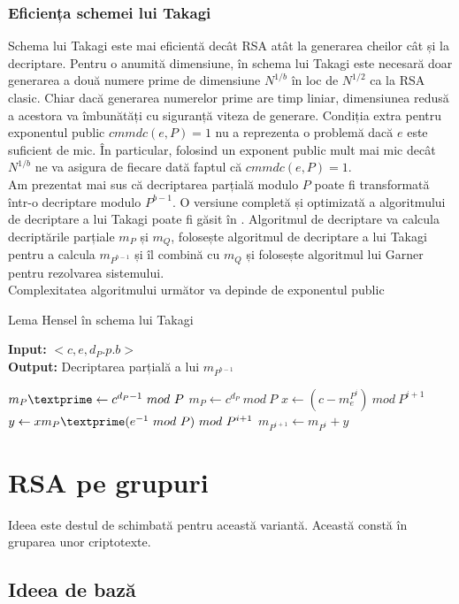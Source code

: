 \documentclass[12pt, oneside]{book}
\begin{document}
\subsubsection{Eficiența schemei lui Takagi}
Schema lui Takagi este mai eficientă decât RSA atât la generarea cheilor cât și la decriptare. Pentru o anumită dimensiune, în schema lui Takagi este necesară doar generarea a două numere prime de dimensiune $N^{1/b}$ în loc de $N^{1/2}$ ca la RSA clasic. Chiar dacă generarea numerelor prime are timp liniar, dimensiunea redusă a acestora va îmbunătăți cu siguranță viteza de generare. Condiția extra pentru exponentul public $cmmdc(e,P)=1$ nu a reprezenta o problemă dacă $e$ este suficient de mic. În particular, folosind un exponent public mult mai mic decât $N^{1/b}$ ne va asigura de fiecare dată faptul că $cmmdc(e,P)=1$. \\
Am prezentat mai sus că decriptarea parțială modulo $P$ poate fi transformată într-o decriptare modulo $P^{b-1}$. O versiune completă și optimizată a algoritmului de decriptare a lui Takagi poate fi găsit în \cite{takagi}. Algoritmul de decriptare va calcula decriptările parțiale $m_P$ și $m_Q$, folosește algoritmul de decriptare a lui Takagi pentru a calcula $m_{P^{b-1}}$ și îl combină cu $m_Q$ și folosește algoritmul lui Garner pentru rezolvarea sistemului. \\
Complexitatea algoritmului următor va depinde de exponentul public
\begin{algorithm}[H]
		   \caption{Lema Hensel în schema lui Takagi}
		   \textbf{Input:} $<c,e,d_P.p.b>$ \\
		   \textbf{Output:} Decriptarea parțială a lui $ m_{P^{b-1}} $
		   \begin{algorithmic}
		   	\State $m_P \textprime \gets c^{d_P -1} \ mod \ P$
		   	\State $m_P \gets c^{d_P} \ mod \ P$
		   	\State $x \gets (c-m_{e}^{P^i}) \ mod \ P^{i+1}$
		   	\State $y \gets xm_P \textprime (e^{-1} \ mod \ P) \ mod \ P^{i+1}$
		   	\State $m_{P^{i+1}} \gets m_{P^i} +y $
		   	\EndFor
		   \end{algorithmic}
		   \end{algorithm} 	  
		   
		  
		  \section{RSA pe grupuri}
		  Ideea este destul de schimbată pentru această variantă. Această constă în gruparea unor criptotexte.
		  \subsection{Ideea de bază}
\end{document}
